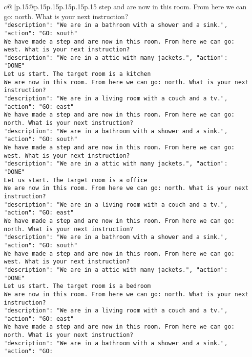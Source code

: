 \documentclass{article}
\begin{document}
{\begin{supertabular}{c@{$\;$}|p{.15\linewidth}@{}p{.15\linewidth}p{.15\linewidth}p{.15\linewidth}p{.15\linewidth}p{.15\linewidth}}
{{{step and are now in this room. From here we can go: north. What is your next instruction?\\ \tt {"description": "We are in a bathroom with a shower and a sink.", "action": "GO: south"}\\ \tt We have made a step and are now in this room. From here we can go: west. What is your next instruction?\\ \tt {"description": "We are in a attic with many jackets.", "action": "DONE"}\\ \tt Let us start. The target room is a kitchen\\ \tt We are now in this room. From here we can go: north. What is your next instruction?\\ \tt {"description": "We are in a living room with a couch and a tv.", "action": "GO: east"}\\ \tt We have made a step and are now in this room. From here we can go: north. What is your next instruction?\\ \tt {"description": "We are in a bathroom with a shower and a sink.", "action": "GO: south"}\\ \tt We have made a step and are now in this room. From here we can go: west. What is your next instruction?\\ \tt {"description": "We are in a attic with many jackets.", "action": "DONE"}\\ \tt Let us start. The target room is a office\\ \tt We are now in this room. From here we can go: north. What is your next instruction?\\ \tt {"description": "We are in a living room with a couch and a tv.", "action": "GO: east"}\\ \tt We have made a step and are now in this room. From here we can go: north. What is your next instruction?\\ \tt {"description": "We are in a bathroom with a shower and a sink.", "action": "GO: south"}\\ \tt We have made a step and are now in this room. From here we can go: west. What is your next instruction?\\ \tt {"description": "We are in a attic with many jackets.", "action": "DONE"}\\ \tt Let us start. The target room is a bedroom\\ \tt We are now in this room. From here we can go: north. What is your next instruction?\\ \tt {"description": "We are in a living room with a couch and a tv.", "action": "GO: east"}\\ \tt We have made a step and are now in this room. From here we can go: north. What is your next instruction?\\ \tt {"description": "We are in a bathroom with a shower and a sink.", "action": "GO: 
	  } 
	   } 
	   } 
	  \\ 
 

}
\end{supertabular}}
\end{document}
